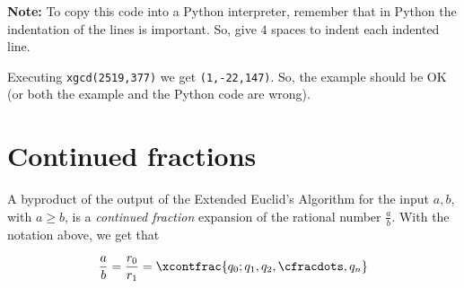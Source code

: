 \documentclass{amsart}
\begin{document}
\noindent\textbf{Note:} To copy this code into a Python interpreter, remember that in Python the indentation of the lines is important. So, give $4$ spaces to indent each indented line.

Executing \lstinline{xgcd(2519,377)} we get \lstinline{(1,-22,147)}. So, the example should be OK (or both the example and the Python code are wrong).

\section*{Continued fractions}

A byproduct of the output of the Extended Euclid's Algorithm for the input $a,b$, with $a\geq b$, is a \emph{continued fraction} expansion of the rational number $\frac{a}{b}$. With the notation above, we get that 

$$\frac{a}{b}=\frac{r_0}{r_1}=\xcontfrac{q_0;q_1,q_2,\cfracdots,q_n}$$
\end{document}
